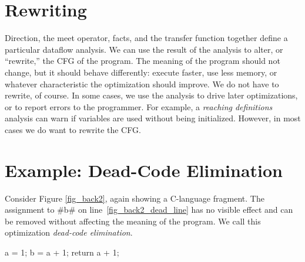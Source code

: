 \documentclass[12pt]{report}
\begin{document}
\section{Rewriting}
\label{sec_back7}


Direction, the meet operator, facts, and the transfer function
together define a particular dataflow analysis. We can use the result
of the analysis to alter, or ``rewrite,'' the CFG of the program. The
meaning of the program should not change, but it should behave
differently: execute faster, use less memory, or whatever
characteristic the optimization should improve.  We do not have to
rewrite, of course. In some cases, we use the analysis to drive later
optimizations, or to report errors to the programmer. For example, a
\emph{reaching definitions} \citep{AhoXX} analysis can warn if
variables are used without being initialized. However, in most cases
we do want to rewrite the CFG.

\section{Example: Dead-Code Elimination}
\label{sec_back2}


Consider Figure \ref{fig_back2}, again showing a C-language fragment.
The assignment to #b# on line~\ref{fig_back2_dead_line} has no visible
effect and can be removed without affecting the meaning of the
program. We call this optimization \emph{dead-code elimination}.

\begin{myfig}[ht]
\begin{minipage}{1in}
  \begin{AVerb}[numbers=left]
    a = 1;
    b = a + 1;\label{fig_back2_dead_line}
    return a + 1;
  \end{AVerb}
\end{minipage}
\caption{A C-language fragment illustrating \emph{dead code}. After
assignment on line \ref{fig_back2_dead_line}, \verb=b= is not used
and can be considered ``dead.''}
\label{fig_back2}
\end{myfig}
\end{document}
